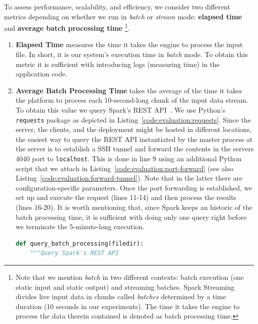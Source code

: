 To assess performance, scalability, and efficiency, we consider two different metrics depending on whether we run in \emph{batch} or \emph{stream} mode: \textbf{elapsed time} and \textbf{average batch processing time}
\footnote{
Note that we mention \textit{batch} in two different contexts: batch execution (one static input and static output) and streaming batches.
Spark Streaming divides live input data in chunks called \emph{batches} determined by a time duration (10 seconds in our experiments).
The time it takes the engine to process the data therein contained is denoted as batch processing time.}.
\begin{enumerate}
    \item \textbf{Elapsed Time} measures the time it takes the engine to process the input file. In short, it is our system's execution time in \emph{batch} mode. To obtain this metric it is sufficient with introducing logs (measuring time) in the application code.
    \item \textbf{Average Batch Processing Time} takes the average of the time it takes the platform to process each 10-second-long chunk of the input data stream. To obtain this value we query Spark's REST API~\cite{spark-rest-api}. We use Python's \texttt{requests} package as depicted in Listing~\ref{code:evaluation:requests}. Since the server, the clients, and the deployment might be hosted in different locations, the easiest way to query the REST API instantiated by the master process at the server is to establish a SSH tunnel and forward the contents in the servers $4040$ port to \texttt{localhost}. This is done in line 9 using an additional Python script that we attach in Listing~\ref{code:evaluation:port-forward} (see also Listing~\ref{code:evaluation:forward-tunnel}). Note that in the latter there are configuration-specific parameters. Once the port forwarding is established, we set up and execute the request (lines 11-14) and then process the results (lines 16-20). It is worth mentioning that, since Spark keeps an historic of the batch processing time, it is sufficient with doing only one query right before we terminate the 5-minute-long execution.
\begin{lstlisting}[language=Python,caption={Snippet illustrating a query to Spark's REST API.},label=code:evaluation:requests]
def query_batch_processing(filedir):
    """Query Spark's REST API 


\end{lstlisting}
\end{enumerate}
